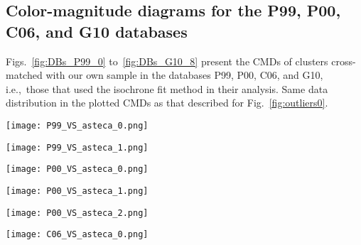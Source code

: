 \documentclass{aa}
\begin{document}
\begin{appendix}
\section{Color-magnitude diagrams for the P99, P00, C06, and G10 databases}
\label{apdx:databases}

Figs.~\ref{fig:DBs_P99_0} to~\ref{fig:DBs_G10_8} present the CMDs of clusters
cross-matched with our own sample in the databases P99, P00, C06, and G10,
i.e.,\ those that used the isochrone fit method in their analysis.
%
Same data distribution in the plotted CMDs as that described for
Fig.~\ref{fig:outliers0}.

\begin{figure*}
\texttt{[image: P99\_VS\_asteca\_0.png]}
\caption{CMDs for the P99 database.}
\label{fig:DBs_P99_0}
\end{figure*}
\clearpage

\begin{figure*}
\texttt{[image: P99\_VS\_asteca\_1.png]}
\caption{CMDs for the P99 database.}
\label{fig:DBs_P99_1}
\end{figure*}
\clearpage

\begin{figure*}
\texttt{[image: P00\_VS\_asteca\_0.png]}
\caption{CMDs for the P00 database.}
\label{fig:DBs_P00_0}
\end{figure*}
\clearpage

\begin{figure*}
\texttt{[image: P00\_VS\_asteca\_1.png]}
\caption{CMDs for the P00 database.}
\label{fig:DBs_P00_1}
\end{figure*}
\clearpage

\begin{figure*}
\texttt{[image: P00\_VS\_asteca\_2.png]}
\caption{CMDs for the P00 database.}
\label{fig:DBs_P00_2}
\end{figure*}
\clearpage

\begin{figure*}
\texttt{[image: C06\_VS\_asteca\_0.png]}
\caption{CMDs for the C06 database.}
\label{fig:DBs_C06_0}
\end{figure*}
\clearpage


\end{appendix}
\end{document}
